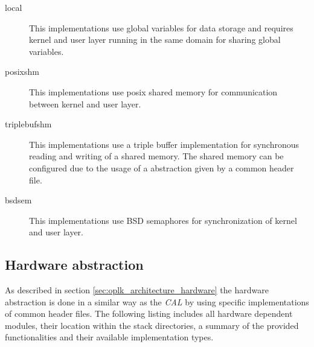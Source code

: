 \begin{description}
    \item[local] This implementations use global variables for data storage and requires kernel and user layer running in the same domain for sharing global variables.
    \item[posixshm] This implementations use posix shared memory for communication between kernel and user layer.
    \item[triplebufshm] This implementations use a triple buffer implementation for synchronous reading and writing of a shared memory.
    The shared memory can be configured due to the usage of a abstraction given by a common header file.
    \item[bsdsem] This implementations use BSD semaphores for synchronization of kernel and user layer.
\end{description}



\subsection{Hardware abstraction}
\label{sec:oplk_platform_hardware}

As described in section \ref{sec:oplk_architecture_hardware} the hardware abstraction is done in a similar way as the \emph{CAL} by using specific implementations of common header files.
The following listing includes all hardware dependent modules, their location within the stack directories, a summary of the provided functionalities and their available implementation types.

